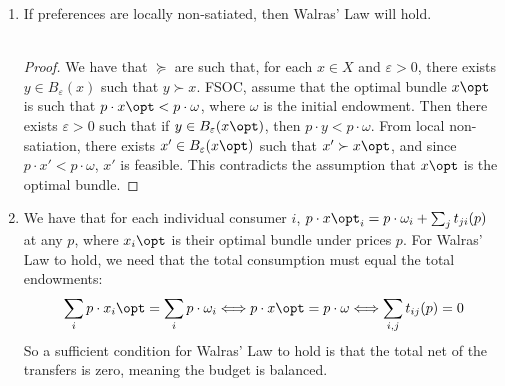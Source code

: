 \documentclass[10pt]{article}
\begin{document}
\maketitle


\begin{enumerate}
	\item If preferences are locally non-satiated, then Walras' Law will hold. \\\\\begin{proof} We have that $\succeq$ are such that, for each $x \in X$ and $\varepsilon > 0$, there exists $y \in B_\varepsilon(x)$ such that $y \succ x$. FSOC, assume that the optimal bundle $x\opt$ is such that $p \cdot x\opt < p \cdot \omega$, where $\omega$ is the initial endowment. Then there exists $\varepsilon > 0$ such that if $y \in B_\varepsilon(x\opt)$, then $p \cdot y < p \cdot \omega$. From local non-satiation, there exists $x'\in B_\varepsilon(x\opt)$ such that $x' \succ x\opt$, and since $p \cdot x' < p \cdot \omega$, $x'$ is feasible. This contradicts the assumption that $x\opt$ is the optimal bundle.\end{proof}
	\item We have that for each individual consumer $i$, $p \cdot x\opt_i = p \cdot \omega_i + \sum_j t_{ji}(p)$ at any $p$, where $x_i\opt$ is their optimal bundle under prices $p$. For Walras' Law to hold, we need that the total consumption must equal the total endowments: \[\sum_i p \cdot x_i\opt = \sum_i p \cdot \omega_i \Longleftrightarrow p \cdot x\opt = p \cdot \omega  \Longleftrightarrow \sum_{i,j} t_{ij}(p) = 0\]So a sufficient condition for Walras' Law to hold is that the total net of the transfers is zero, meaning the budget is balanced.

\end{enumerate}
\end{document}
